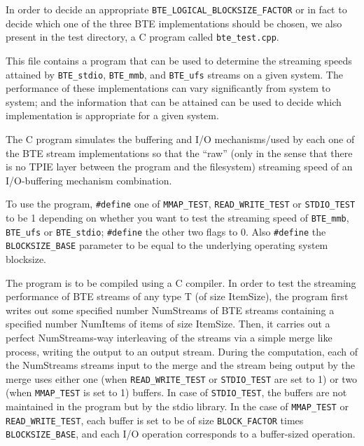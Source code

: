 In order to decide an appropriate \verb|BTE_LOGICAL_BLOCKSIZE_FACTOR|
or in fact to decide which one of the three BTE implementations 
should be chosen, we also present in the test directory, a C program
called \verb|bte_test.cpp|.
  

This file contains a program that can be used to determine the 
streaming speeds attained by \verb|BTE_stdio|, \verb|BTE_mmb|, and
\verb|BTE_ufs| 
streams on a given system. The performance of these implementations
can vary significantly from system to system; and the information 
that can be attained  can be used to decide which implementation
is appropriate for a given system. 

The C program simulates the buffering and I/O mechanisms/used by each 
one of the BTE stream implementations so that the ``raw'' (only in the 
sense that there is no TPIE layer between
the program and the filesystem) streaming speed of an 
I/O-buffering mechanism combination.

To use the program,  \verb|#define| one of  \verb|MMAP_TEST|,
\verb|READ_WRITE_TEST| or  \verb|STDIO_TEST|
 to be 1 depending on whether you want to test the streaming
speed of  \verb|BTE_mmb|, \verb|BTE_ufs| or  \verb|BTE_stdio|;
\verb|#define|  the other two 
flags to 0. Also \verb|#define| the \verb|BLOCKSIZE_BASE|
 parameter to be equal to the underlying operating system blocksize. 


The program is to be compiled using a C compiler. In order to test the streaming 
performance of  BTE streams of any type T (of size ItemSize), the program 
first writes out some specified number NumStreams of BTE streams containing 
a specified number NumItems of items of size ItemSize. Then, it carries
out a perfect NumStreams-way interleaving of the streams via a simple
merge like process, writing the output to an output stream. During the 
computation, each of the NumStreams streams input to the merge and 
the stream being output by the merge uses either one (when \verb|READ_WRITE_TEST|
or \verb|STDIO_TEST| are set to 1)  or two (when \verb|MMAP_TEST| 
is set to 1) buffers.
In case of \verb|STDIO_TEST|, the buffers are not maintained in the program
but by the stdio library. In the case of \verb|MMAP_TEST| or \verb|READ_WRITE_TEST|,
each buffer is set to be of size \verb|BLOCK_FACTOR| times \verb|BLOCKSIZE_BASE|, and
each I/O operation corresponds to a buffer-sized operation. 

